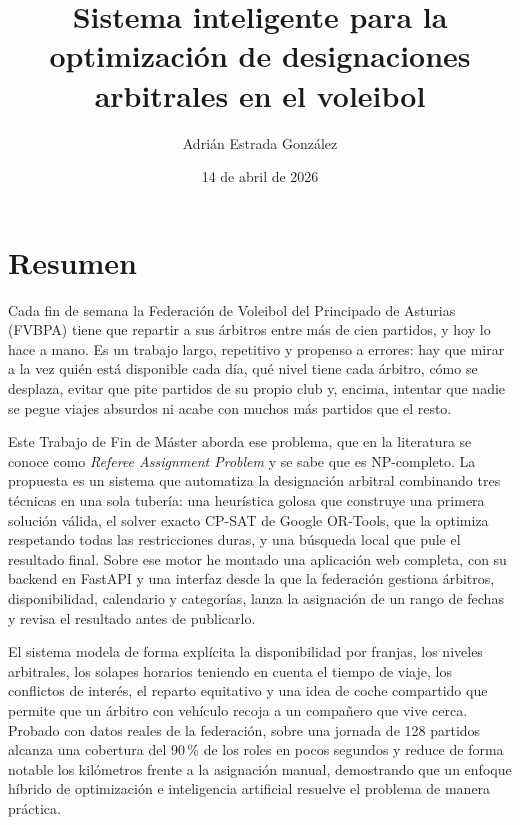 \documentclass[11pt,a4paper,spanish]{book}
\title{Sistema inteligente para la optimización de designaciones arbitrales en el voleibol}
\author{Adrián Estrada González}
\date{14 de abril de 2026}
\numberwithin{equation}{chapter}
\numberwithin{figure}{chapter}
\numberwithin{table}{chapter}
\begin{document}
\renewcommand{\listfigurename}{Índice de Ilustraciones}
\renewcommand{\listtablename}{Índice de Tablas}
\renewcommand{\contentsname}{Índice de Contenidos}
\renewcommand{\figurename}{Figura}
\renewcommand{\tablename}{Tabla}

\maketitle

\frontmatter
\tableofcontents
\listoffigures
\listoftables

\chapter{Resumen}

Cada fin de semana la Federación de Voleibol del Principado de Asturias (FVBPA) tiene que repartir a sus árbitros entre más de cien partidos, y hoy lo hace a mano. Es un trabajo largo, repetitivo y propenso a errores: hay que mirar a la vez quién está disponible cada día, qué nivel tiene cada árbitro, cómo se desplaza, evitar que pite partidos de su propio club y, encima, intentar que nadie se pegue viajes absurdos ni acabe con muchos más partidos que el resto.

Este Trabajo de Fin de Máster aborda ese problema, que en la literatura se conoce como \emph{Referee Assignment Problem} y se sabe que es NP-completo. La propuesta es un sistema que automatiza la designación arbitral combinando tres técnicas en una sola tubería: una heurística golosa que construye una primera solución válida, el solver exacto CP-SAT de Google OR-Tools, que la optimiza respetando todas las restricciones duras, y una búsqueda local que pule el resultado final. Sobre ese motor he montado una aplicación web completa, con su backend en FastAPI y una interfaz desde la que la federación gestiona árbitros, disponibilidad, calendario y categorías, lanza la asignación de un rango de fechas y revisa el resultado antes de publicarlo.

El sistema modela de forma explícita la disponibilidad por franjas, los niveles arbitrales, los solapes horarios teniendo en cuenta el tiempo de viaje, los conflictos de interés, el reparto equitativo y una idea de coche compartido que permite que un árbitro con vehículo recoja a un compañero que vive cerca. Probado con datos reales de la federación, sobre una jornada de 128 partidos alcanza una cobertura del 90\,\% de los roles en pocos segundos y reduce de forma notable los kilómetros frente a la asignación manual, demostrando que un enfoque híbrido de optimización e inteligencia artificial resuelve el problema de manera práctica.
\end{document}
